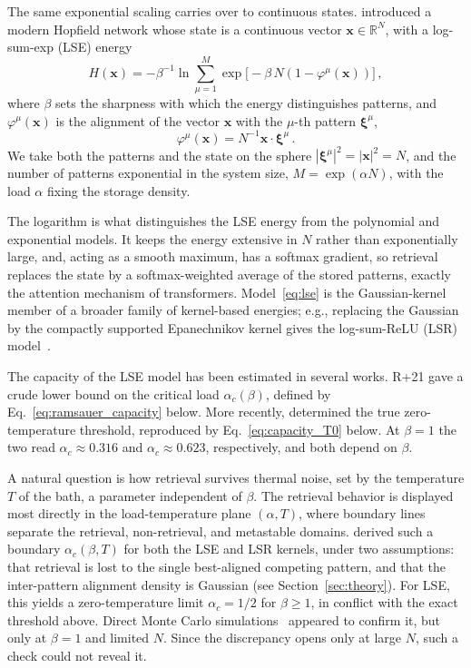 \documentclass[letterpaper]{article} %
\newcommand{\bxi}{\boldsymbol{\xi}}
\newcommand{\bx}{\bm{x}}
\newcommand{\Bnet}{\beta}
\begin{document}
The same exponential scaling carries over to continuous states. \citet[][hereafter R+21]{ramsauer2021hopfield} introduced a modern Hopfield network whose state is a continuous vector $\bx \in \mathbb{R}^N$, with a log-sum-exp (LSE) energy
\begin{equation}
H(\bx) = -\Bnet^{-1}\ln\sum_{\mu=1}^{M}\exp\!\big[-\Bnet\,N (1-\varphi^\mu(\bx)) \big]\,,
\label{eq:lse}
\end{equation}
where $\Bnet$ sets the sharpness with which the energy distinguishes patterns, and $\varphi^\mu(\bx)$ is the alignment of the vector $\bx$ with the $\mu$-th pattern $\bxi^\mu$,
\begin{equation}
    \varphi^\mu(\bm{x}) = N^{-1} \bm{x} \cdot \bm{\xi}^\mu\,.
    \label{eq:alignment}
\end{equation}
We take both the patterns and the state on the sphere $|\bxi^\mu|^2 = |\bx|^2 = N$, and the number of patterns exponential in the system size, $M = \exp(\alpha N)$, with the load $\alpha$ fixing the storage density.

The logarithm is what distinguishes the LSE energy from the polynomial and exponential models. It keeps the energy extensive in $N$ rather than exponentially large, and, acting as a smooth maximum, has a softmax gradient, so retrieval replaces the state by a softmax-weighted average of the stored patterns, exactly the attention mechanism of transformers. Model~\eqref{eq:lse} is the Gaussian-kernel member of a broader family of kernel-based energies; e.g., replacing the Gaussian by the compactly supported Epanechnikov kernel gives the log-sum-ReLU (LSR) model~\citep{hoover2025dense}.

The capacity of the LSE model has been estimated in several works. R+21 gave a crude lower bound on the critical load $\alpha_c(\Bnet)$, defined by Eq.~\eqref{eq:ramsauer_capacity} below. More recently, \citet[][hereafter LM24]{lucibello2024exponential} determined the true zero-temperature threshold, reproduced by Eq.~\eqref{eq:capacity_T0} below. At $\Bnet=1$ the two read $\alpha_c \approx 0.316$ and $\alpha_c \approx 0.623$, respectively, and both depend on $\Bnet$.

A natural question is how retrieval survives thermal noise, set by the temperature $T$ of the bath, a parameter independent of $\Bnet$. The retrieval behavior is displayed most directly in the load-temperature plane $(\alpha, T)$, where boundary lines separate the retrieval, non-retrieval, and metastable domains. \citet[][hereafter PPS26]{icml2026theory} derived such a boundary $\alpha_c(\Bnet, T)$ for both the LSE and LSR kernels, under two assumptions: that retrieval is lost to the single best-aligned competing pattern, and that the inter-pattern alignment density is Gaussian (see Section~\ref{sec:theory}). For LSE, this yields a zero-temperature limit $\alpha_c = 1/2$ for $\Bnet\ge 1$, in conflict with the exact threshold above. Direct Monte Carlo simulations~\citep{iclr2026mc} appeared to confirm it, but only at $\Bnet=1$ and limited $N$. Since the discrepancy opens only at large $N$, such a check could not reveal it.
\end{document}
